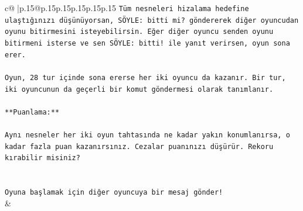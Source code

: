 \documentclass{article}
\begin{document}
{\begin{supertabular}{c@{$\;$}|p{.15\linewidth}@{}p{.15\linewidth}p{.15\linewidth}p{.15\linewidth}p{.15\linewidth}p{.15\linewidth}}
{{{\texttt{Tüm nesneleri hizalama hedefine ulaştığınızı düşünüyorsan, SÖYLE: bitti mi? göndererek diğer oyuncudan oyunu bitirmesini isteyebilirsin. Eğer diğer oyuncu senden oyunu bitirmeni isterse ve sen SÖYLE: bitti! ile yanıt verirsen, oyun sona erer.} \\
\\ 
\texttt{Oyun, 28 tur içinde sona ererse her iki oyuncu da kazanır. Bir tur, iki oyuncunun da geçerli bir komut göndermesi olarak tanımlanır.} \\
\\ 
\texttt{**Puanlama:**} \\
\\ 
\texttt{Aynı nesneler her iki oyun tahtasında ne kadar yakın konumlanırsa, o kadar fazla puan kazanırsınız. Cezalar puanınızı düşürür. Rekoru kırabilir misiniz?} \\
\\ 
\\ 
\texttt{Oyuna başlamak için diğer oyuncuya bir mesaj gönder!} \\
            }
        }
    }
    & \\ \\


\end{supertabular}}
\end{document}
